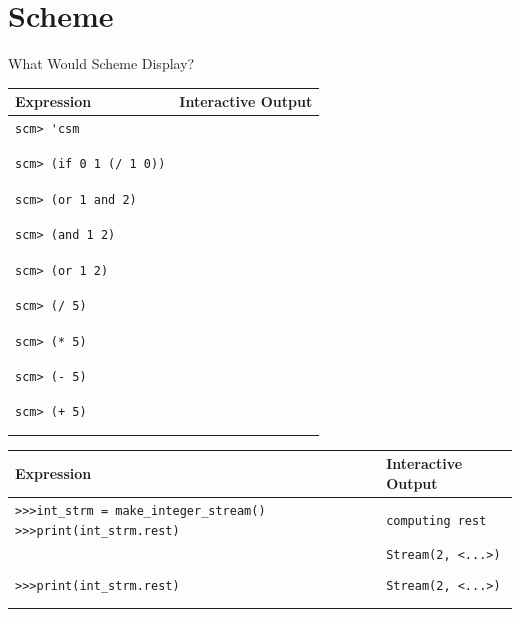 \documentclass{exam}
\begin{document}
\section{Scheme}
\begin{questions}

\item What Would Scheme Display?
\begin{center}
    \begin{tabular}{|m{9cm}|m{6cm}|}
\hline
\textbf{Expression} & \textbf{Interactive Output} \\
\hline
\lstinline$scm> 'csm$ & \\ & \\ & \\
\hline
\lstinline$scm> (if 0 1 (/ 1 0))$ & \\ & \\ & \\
\hline
\lstinline$scm> (or 1 and 2)$ & \\ & \\ & \\
\hline
\lstinline$scm> (and 1 2)$ & \\ & \\ & \\
\hline
\lstinline$scm> (or 1 2)$ & \\ & \\ & \\
\hline
\lstinline$scm> (/ 5)$ & \\ & \\ & \\
\hline
\lstinline$scm> (* 5)$ & \\ & \\ & \\
\hline
\lstinline$scm> (- 5)$ & \\ & \\ & \\
\hline
\lstinline$scm> (+ 5)$ & \\ & \\ & \\
\hline
\end{tabular}
\end{center}

\begin{solution}
\begin{center}
    \begin{tabular}{|m{9cm}|m{6cm}|}
\hline
\textbf{Expression} & \textbf{Interactive Output} \\
\hline
\lstinline$>>>int_strm = make_integer_stream()$
 \lstinline$>>>print(int_strm.rest)$ & \color{red}\lstinline$computing rest$ \\
 & \color{red}\lstinline$Stream(2, <...>)$ \\ & \\
\hline
\lstinline$>>>print(int_strm.rest)$ & \color{red}\lstinline$Stream(2, <...>)$ \\ & \\ & \\
\hline
\end{tabular}
\end{center}
\end{solution}


\end{questions}
\end{document}
